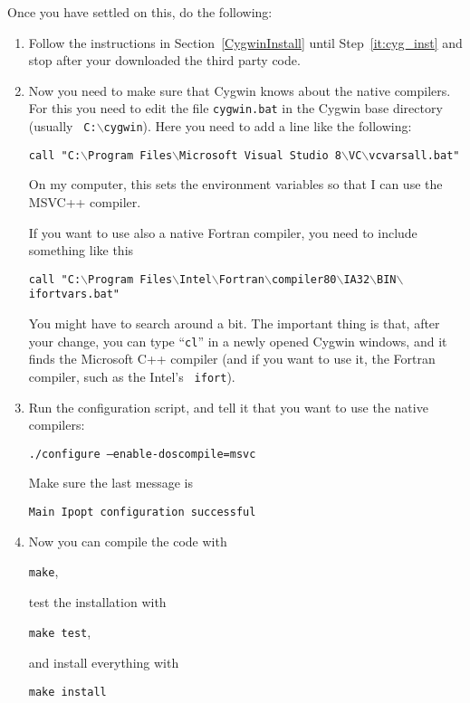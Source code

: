 \documentclass[10pt]{article}
\begin{document}
\noindent
Once you have settled on this, do the following:

\begin{enumerate}
\item Follow the instructions in Section~\ref{CygwinInstall} until
  Step~\ref{it:cyg_inst} and stop after your downloaded the third
  party code.

\item\label{it:setupmsvcpath} Now you need to make sure that Cygwin
  knows about the native compilers.  For this you need to edit the
  file {\tt cygwin.bat} in the Cygwin base directory (usually {\tt
    C:$\backslash$cygwin}).  Here you need to add a line like the
  following:

  \texttt{call "C:$\backslash$Program Files$\backslash$Microsoft Visual
    Studio 8$\backslash$VC$\backslash$vcvarsall.bat"}

  On my computer, this sets the environment variables so that I can use
  the MSVC++ compiler.

  If you want to use also a native Fortran compiler, you need to
  include something like this

  \texttt{call "C:$\backslash$Program
    Files$\backslash$Intel$\backslash$Fortran$\backslash$compiler80$\backslash$IA32$\backslash$BIN$\backslash$ifortvars.bat"}

  You might have to search around a bit.  The important thing is that,
  after your change, you can type ``{\tt cl}'' in a newly opened
  Cygwin windows, and it finds the Microsoft C++ compiler (and if you
  want to use it, the Fortran compiler, such as the Intel's {\tt
    ifort}).

\item Run the configuration script, and tell it that you want to use
  the native compilers:

  \texttt{./configure --enable-doscompile=msvc}

  Make sure the last message is

  \texttt{Main Ipopt configuration successful}

%
%
%

\item Now you can compile the code with

  \texttt{make},

  test the installation with

  \texttt{make test},

  and install everything with

  \texttt{make install}
\end{enumerate}
\end{document}
